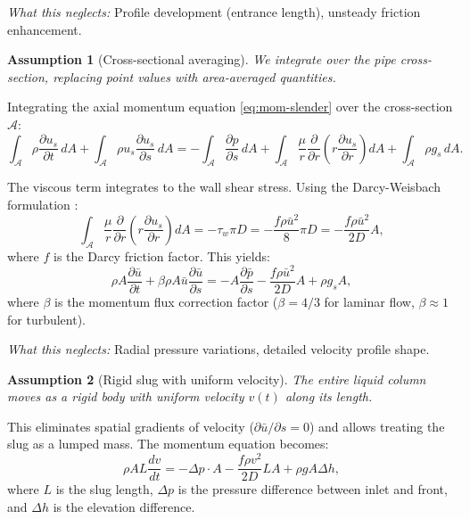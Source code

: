 \documentclass[11pt,a4paper]{article}
\newtheorem{assumption}{Assumption}
\theoremstyle{definition}
\begin{document}
\textit{What this neglects:} Profile development (entrance length), unsteady friction enhancement.

\begin{assumption}[Cross-sectional averaging]
We integrate over the pipe cross-section, replacing point values with area-averaged quantities.
\end{assumption}

Integrating the axial momentum equation \eqref{eq:mom-slender} over the cross-section $\mathcal{A}$:
\begin{equation}
  \int_{\mathcal{A}} \rho\frac{\partial u_s}{\partial t}\,dA + \int_{\mathcal{A}} \rho u_s\frac{\partial u_s}{\partial s}\,dA = -\int_{\mathcal{A}} \frac{\partial p}{\partial s}\,dA + \int_{\mathcal{A}} \frac{\mu}{r}\frac{\partial}{\partial r}\left(r\frac{\partial u_s}{\partial r}\right)dA + \int_{\mathcal{A}} \rho g_s\,dA.
  \label{eq:integrated-mom}
\end{equation}

The viscous term integrates to the wall shear stress. Using the Darcy-Weisbach formulation \citep{brown2002history}:
\begin{equation}
  \int_{\mathcal{A}} \frac{\mu}{r}\frac{\partial}{\partial r}\left(r\frac{\partial u_s}{\partial r}\right)dA = -\tau_w \pi D = -\frac{f\rho \bar{u}^2}{8}\pi D = -\frac{f\rho \bar{u}^2}{2D}A,
  \label{eq:wall-shear}
\end{equation}
where $f$ is the Darcy friction factor. This yields:
\begin{equation}
  \rho A \frac{\partial \bar{u}}{\partial t} + \beta\rho A \bar{u}\frac{\partial \bar{u}}{\partial s} = -A\frac{\partial \bar{p}}{\partial s} - \frac{f\rho \bar{u}^2}{2D}A + \rho g_s A,
  \label{eq:averaged-mom}
\end{equation}
where $\beta$ is the momentum flux correction factor ($\beta = 4/3$ for laminar flow, $\beta \approx 1$ for turbulent).

\textit{What this neglects:} Radial pressure variations, detailed velocity profile shape.

\begin{assumption}[Rigid slug with uniform velocity]
The entire liquid column moves as a rigid body with uniform velocity $v(t)$ along its length.
\end{assumption}

This eliminates spatial gradients of velocity ($\partial\bar{u}/\partial s = 0$) and allows treating the slug as a lumped mass. The momentum equation becomes:
\begin{equation}
  \rho A L \frac{dv}{dt} = -\Delta p \cdot A - \frac{f\rho v^2}{2D}LA + \rho g A \Delta h,
  \label{eq:slug-mom}
\end{equation}
where $L$ is the slug length, $\Delta p$ is the pressure difference between inlet and front, and $\Delta h$ is the elevation difference.
\end{document}
